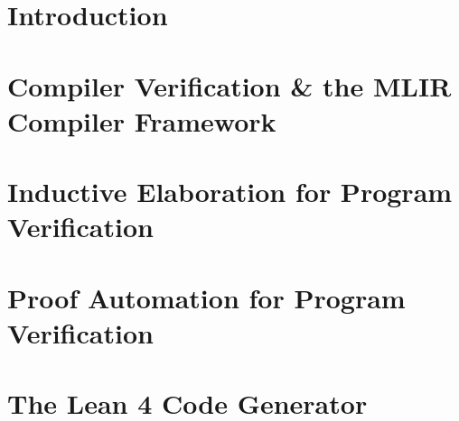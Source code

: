 \chapter{Introduction}
\chapter{Compiler Verification \& the MLIR Compiler Framework}
\chapter{Inductive Elaboration for Program Verification}
\chapter{Proof Automation for Program Verification}
\chapter{The Lean 4 Code Generator}

